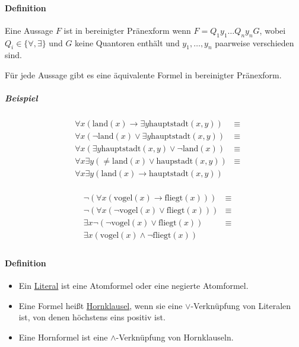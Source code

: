 \documentclass[a4paper]{scrartcl}
\begin{document}
\paragraph{Definition} Eine Aussage $F$ ist in bereinigter Pränexform wenn $F= Q_1 y_1 \dots Q_n y_n G$, wobei $Q_i \in \{ \forall , \exists \}$ und $G$ keine Quantoren enthält und $y_1,\dots,y_n$ paarweise verschieden sind.

Für jede Aussage gibt es eine äquivalente Formel in bereinigter Pränexform.

\subparagraph{Beispiel} \begin{align*} 
&\forall x ( \text{land} (x) \rightarrow \exists y \text{hauptstadt} (x,y)) &\equiv \\ 
&\forall x (\neg \text{land}(x) \vee \exists y \text{hauptstadt} (x,y)) &\equiv \\
&\forall x (\exists y \text{hauptstadt}(x,y) \vee \neg \text{land} (x)) &\equiv\\
&\forall x \exists y (\neq \text{land}(x) \vee \text{haupstadt}(x,y) ) &\equiv\\
&\forall x \exists y (\text{land} (x) \rightarrow \text{hauptstadt} (x,y))\\
\end{align*}

\begin{align*}
&\neg (\forall x(\text{vogel}(x) \rightarrow \text{fliegt} (x) ) ) &\equiv \\
&\neg (\forall x(\neg\text{vogel}(x) \vee \text{fliegt} (x) )) &\equiv \\
&\exists x \neg (\neg \text{vogel} (x) \vee \text{fliegt} (x) ) &\equiv \\
&\exists x (\text{vogel} (x) \wedge \neg \text{fliegt} (x))\\
\end{align*}

\paragraph{Definition}
\begin{itemize}
\item Ein \underline{Literal} ist eine Atomformel oder eine negierte Atomformel.
\item Eine Formel heißt \underline{Hornklausel}, wenn sie eine $\vee$-Verknüpfung von Literalen ist, von denen höchstens eins positiv ist.
\item Eine Hornformel ist eine $\wedge$-Verknüpfung von Hornklauseln.
\end{itemize}
\end{document}
